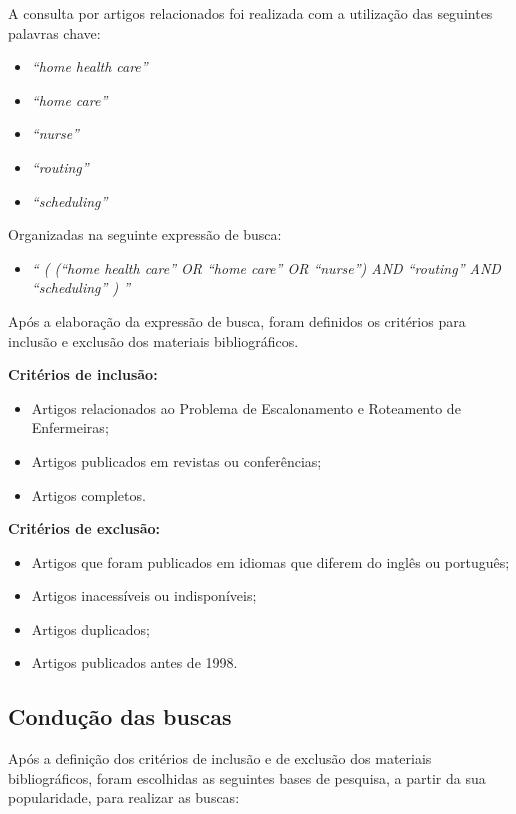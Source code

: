 A consulta por artigos relacionados foi realizada com a utilização das seguintes palavras chave:

\begin{itemize}
\item \textit{``home health care''}
\item \textit{``home care''}
\item \textit{``nurse''}
\item \textit{``routing''}
\item \textit{``scheduling''}
\end{itemize}

Organizadas na seguinte expressão de busca:

\begin{itemize}
\item \textit{`` ( (``home health care'' OR ``home care'' OR ``nurse'') AND ``routing'' AND ``scheduling'' ) ''}
\end{itemize}

Após a elaboração da expressão de busca, foram definidos os critérios para inclusão e exclusão dos materiais bibliográficos.

\textbf{Critérios de inclusão:}

\begin{itemize}
\item Artigos relacionados ao Problema de Escalonamento e Roteamento de Enfermeiras; 
\item Artigos publicados em revistas ou conferências;
\item Artigos completos.
\end{itemize}

\textbf{Critérios de exclusão:}

\begin{itemize}
\item Artigos que foram publicados em idiomas que diferem do inglês ou português;
\item Artigos inacessíveis ou indisponíveis;
\item Artigos duplicados;
\item Artigos publicados antes de 1998.
\end{itemize}

\subsection{\esp Condução das buscas}

Após a definição dos critérios de inclusão e de exclusão dos materiais bibliográficos, foram escolhidas as seguintes bases de pesquisa, a partir da sua popularidade, para realizar as buscas:

